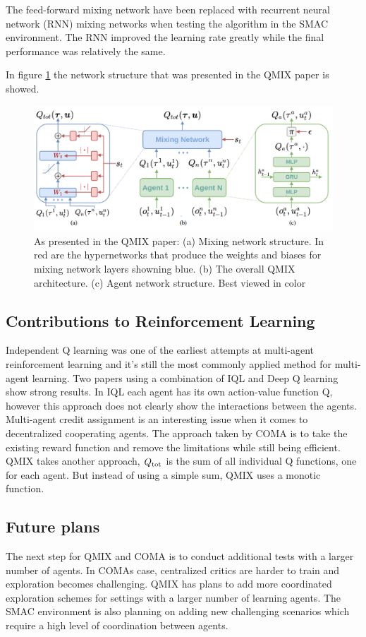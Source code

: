 The feed-forward mixing network have been replaced with recurrent neural network (RNN) mixing networks when testing the algorithm in the SMAC environment. The RNN improved the learning rate greatly while the final performance was relatively the same.

In figure \ref{fig:qmix} the network structure that was presented in the QMIX paper is showed.

\begin{figure}
  \includegraphics[width=\linewidth]{images/qmix.png}
  \caption{As presented in the QMIX paper: (a) Mixing network structure. In red are the hypernetworks that produce the weights and biases for mixing network layers showning blue. (b) The overall QMIX architecture. (c) Agent network structure. Best viewed in color}
  \label{fig:qmix}
\end{figure}

\subsection{Contributions to Reinforcement Learning}

Independent Q learning was one of the earliest attempts at multi-agent reinforcement learning and it's still the most commonly applied method for multi-agent learning. Two papers using a combination of IQL and Deep Q learning show strong results\citep{tampuu2017multiagent}\citep{leibo2017multi}. In IQL each agent has its own action-value function Q, however this approach does not clearly show the interactions between the agents. Multi-agent credit assignment is an interesting issue when it comes to decentralized cooperating agents. The approach taken by COMA is to take the existing reward function and remove the limitations while still being efficient.
QMIX takes another approach, $Q\textsubscript{tot}$ is the sum of all individual Q functions, one for each agent. But instead of using a simple sum, QMIX uses a monotic function.

\subsection{Future plans}
The next step for QMIX and COMA is to conduct additional tests with a larger number of agents. In COMAs case, centralized critics are harder to train and exploration becomes challenging. QMIX has plans to add more coordinated exploration schemes for settings with a larger number of learning agents. The SMAC environment is also planning on adding new challenging scenarios which require a high level of coordination between agents.